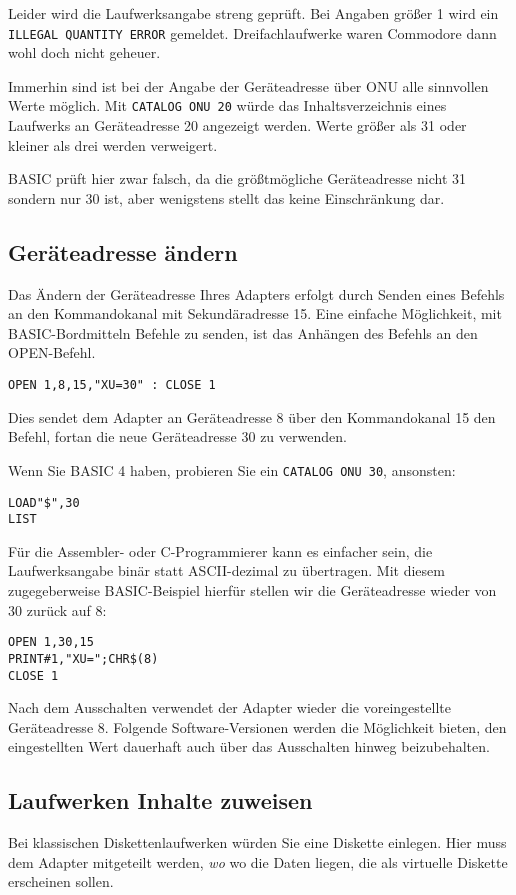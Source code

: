 \documentclass[10pt,a4paper]{scrartcl}		%
\begin{document}
Leider wird die Laufwerksangabe streng geprüft. Bei Angaben größer 1
wird ein \texttt{ILLEGAL QUANTITY ERROR} gemeldet. Dreifachlaufwerke
waren Commodore dann wohl doch nicht geheuer.

Immerhin sind ist bei der Angabe der Geräteadresse über ONU alle
sinnvollen Werte möglich. Mit \texttt{CATALOG ONU 20} würde das
Inhaltsverzeichnis eines Laufwerks an Geräteadresse 20 angezeigt werden.
Werte größer als 31 oder kleiner als drei werden verweigert. 

BASIC prüft hier zwar falsch, da die größtmögliche Geräteadresse nicht 31
sondern nur 30 ist, aber wenigstens stellt das keine Einschränkung dar.

\subsection{Geräteadresse ändern}
Das Ändern der Geräteadresse Ihres Adapters erfolgt durch Senden
eines Befehls an den Kommandokanal mit Sekundäradresse 15. Eine einfache
Möglichkeit, mit BASIC-Bordmitteln Befehle zu senden, ist das Anhängen
des Befehls an den OPEN-Befehl.

\begin{verbatim}
OPEN 1,8,15,"XU=30" : CLOSE 1
\end{verbatim}

Dies sendet dem Adapter an Geräteadresse 8 über den Kommandokanal 15
den Befehl, fortan die neue Geräteadresse 30 zu verwenden.

Wenn Sie BASIC 4 haben, probieren Sie ein \texttt{CATALOG ONU 30}, ansonsten:
\begin{verbatim}
LOAD"$",30
LIST
\end{verbatim}

Für die Assembler- oder C-Programmierer kann es einfacher sein,
die Laufwerksangabe binär statt ASCII-dezimal zu übertragen. Mit diesem
zugegeberweise BASIC-Beispiel hierfür stellen wir die Geräteadresse
wieder von 30 zurück auf 8:

\begin{verbatim}
OPEN 1,30,15
PRINT#1,"XU=";CHR$(8)
CLOSE 1
\end{verbatim}

Nach dem Ausschalten verwendet der Adapter wieder die voreingestellte
Geräteadresse 8. Folgende Software-Versionen werden die Möglichkeit 
bieten, den eingestellten Wert dauerhaft auch über das Ausschalten hinweg
beizubehalten.

\subsection{Laufwerken Inhalte zuweisen}
Bei klassischen Diskettenlaufwerken würden Sie eine Diskette 
einlegen. Hier muss dem Adapter mitgeteilt werden, \textit{wo} wo die Daten 
liegen, die als virtuelle Diskette erscheinen sollen.
\end{document}
